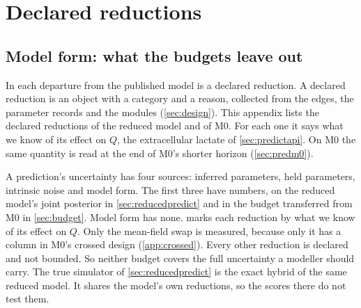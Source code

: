 \section{Declared reductions}
\label{app:reductions}

\subsection{Model form: what the budgets leave out}
\label{sec:modelform}

In \IC{} each departure from the published \syn{} model is a declared reduction. A
declared reduction is an object with a category and a reason, collected from the edges,
the parameter records and the modules (\cref{sec:design}). This appendix lists the
declared reductions of the reduced model and of M0. For each one it says what we know of
its effect on $Q$, the extracellular lactate of \cref{sec:predictapi}. On M0 the same quantity
is read at the end of M0's shorter horizon (\cref{sec:predm0}).

A prediction's uncertainty has four sources: inferred parameters, held parameters,
intrinsic noise and model form. The first three have numbers, on the reduced model's joint
posterior in \cref{sec:reducedpredict} and in the budget transferred from M0 in
\cref{sec:budget}. Model form has none.  marks each reduction
by what we know of its effect on $Q$. Only the mean-field swap is measured, because only it
has a column in M0's crossed design (\cref{app:crossed}). Every other reduction is declared
and not bounded. So neither budget covers the full uncertainty a modeller should carry.
The true simulator of \cref{sec:reducedpredict} is the exact hybrid of the same reduced
model. It shares the model's own reductions, so the scores there do not test them.

